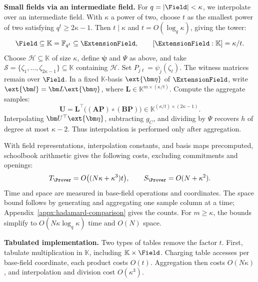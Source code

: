 \smallskip\noindent\textbf{Small fields via an intermediate field.}
For \(q=|\Field|<\kappa\), we interpolate over an intermediate
field. With \(\kappa\) a power of two, choose \(t\)
as the smallest power of two satisfying \(q^t\geq2\kappa-1\).
Then \(t\mid\kappa\) and \(t=O(\log_q\kappa)\), giving the tower:
\[
    \Field\subseteq\mathbb K=\mathbb F_{q^t}
    \subseteq\ExtensionField,
    \qquad [\ExtensionField:\mathbb K]=\kappa/t.
\]
Choose \(\mathcal H\subseteq\mathbb K\) of size \(\kappa\),
define \(\bm\psi\) and \(\Psi\) as above, and take
\(\mathcal S=\{\zeta_1,\ldots,\zeta_{2\kappa-1}\}\subseteq\mathbb K\)
containing \(\mathcal H\).
Set \(P_{j\ell}=\psi_j(\zeta_\ell)\).
The witness matrices remain over \(\Field\).
In a fixed \(\mathbb K\)-basis \(\ext{\bm\eta}\) of
\(\ExtensionField\), write \(\ext{\bm l}=\bm L\ext{\bm\eta}\),
where \(\bm L\in\mathbb K^{m\times(\kappa/t)}\).
Compute the aggregate samples:
\begin{equation}
    \bm U
    =\bm L^\top\bigl((\bm A\bm P)\circ(\bm B\bm P)\bigr)
    \in\mathbb K^{(\kappa/t)\times(2\kappa-1)}.
\label{eq:hadamard-small-field-aggregation}
\end{equation}
Interpolating \(\bm U^\top\ext{\bm\eta}\), subtracting \(g_C\),
and dividing by \(\Psi\) recovers \(h\) of degree at most
\(\kappa-2\). Thus interpolation is performed only after aggregation.

With field representations, interpolation constants, and basis
maps precomputed, schoolbook arithmetic gives the following
costs, excluding commitments and openings:
\begin{equation}
    T_{\Prover}=O\bigl((N\kappa+\kappa^3)t\bigr),
    \qquad S_{\Prover}=O(N+\kappa^2).
\label{eq:hadamard-small-field-cost}
\end{equation}
Time and space are measured in base-field operations and coordinates.
The space bound follows by generating and aggregating one sample
column at a time; Appendix~\ref{appx:hadamard-comparison} gives
the counts. For \(m\geq\kappa\), the bounds simplify to
\(O(N\kappa\log_q\kappa)\) time and \(O(N)\) space.

\smallskip\noindent\textbf{Tabulated implementation.}
Two types of tables remove the factor \(t\).
First, tabulate multiplication in \(\mathbb K\), including
\(\mathbb K\times\Field\).
Charging table accesses per base-field coordinate, each product
costs \(O(t)\). Aggregation then costs \(O(N\kappa)\), and
interpolation and division cost \(O(\kappa^3)\).

